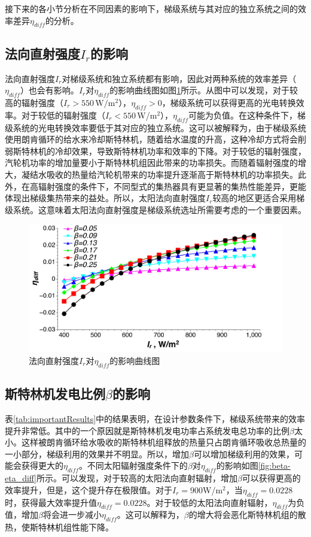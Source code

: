接下来的各小节分析在不同因素的影响下，梯级系统与其对应的独立系统之间的效率差异$\eta_{diff}$的分析。
\subsection{法向直射强度$I_r$的影响}
\label{sec:I_r}

法向直射强度$I_r$对梯级系统和独立系统都有影响，因此对两种系统的效率差异（$\eta_{diff}$）也会有影响。$I_r$对$\eta_{diff}$的影响曲线图如图\ref{fig:I_r-eta_diff}所示。从图中可以发现，对于较高的辐射强度（$I_r > 550\,\mathrm{W/m^2}$），$\eta_{diff}>0$，梯级系统可以获得更高的光电转换效率。对于较低的辐射强度（$I_r < 550\,$W/m$^2$），$\eta_{diff}$可能为负值。在这种条件下，梯级系统的光电转换效率要低于其对应的独立系统。这可以被解释为，由于梯级系统使用朗肯循环的给水来冷却斯特林机，随着给水温度的升高，这种冷却方式将会削弱斯特林机的冷却效果，导致斯特林机功率和效率的下降。对于较低的辐射强度，汽轮机功率的增加量要小于斯特林机组因此带来的功率损失。而随着辐射强度的增大，凝结水吸收的热量给汽轮机带来的功率提升逐渐高于斯特林机的功率损失。此外，在高辐射强度的条件下，不同型式的集热器具有更显著的集热性能差异，更能体现出梯级集热带来的益处。所以，太阳法向直射强度$I_r$较高的地区更适合采用梯级系统。这意味着太阳法向直射强度是梯级系统选址所需要考虑的一个重要因素。
\begin{figure}[htbp]
	\centering
	\includegraphics[width = 0.9\columnwidth, angle = 0]{fig/I_r-eta_diff}
	\caption{法向直射强度$I_r$对$\eta_{diff}$的影响曲线图}
	\label{fig:I_r-eta_diff}
\end{figure}

\subsection{斯特林机发电比例$\beta$的影响}

表\ref{tab:importantResults}中的结果表明，在设计参数条件下，梯级系统带来的效率提升非常低。其中的一个原因就是斯特林机发电功率占系统发电总功率的比例$\beta$太小。这样被朗肯循环给水吸收的斯特林机组释放的热量只占朗肯循环吸收总热量的一小部分，梯级利用的效果并不明显。所以，增加$\beta$可以增加梯级利用的效果，可能会获得更大的$\eta_{diff}$。不同太阳辐射强度条件下的$\beta$对$\eta_{diff}$的影响如图\ref{fig:beta-eta_diff}所示。可以发现，对于较高的太阳法向直射辐射，增加$\beta$可以获得更高的效率提升，但是，这个提升存在极限值。对于$I_r=900$W/m$^2$，当$\eta_{diff}=0.0228$时，获得最大效率提升值$\eta_{diff}=0.0228$。对于较低的太阳法向直射辐射，$\eta_{diff}$为负值，增加$\beta$将会进一步减小$\eta_{diff}$。这可以解释为，$\beta$的增大将会恶化斯特林机组的散热，使斯特林机组性能下降。


